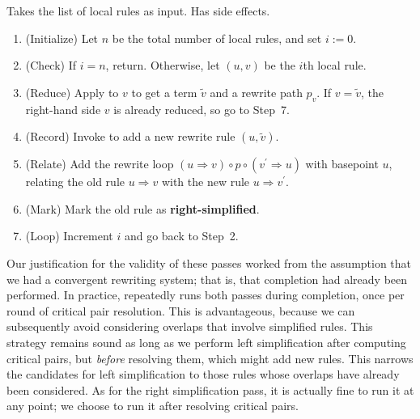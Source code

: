 \documentclass[../generics]{subfiles}
\begin{document}
\begin{algorithm}\label{right simplification}
Takes the list of local rules as input. Has side effects.
\begin{enumerate}
\item (Initialize) Let $n$ be the total number of local rules, and set $i:=0$.
\item (Check) If $i=n$, return. Otherwise, let $(u, v)$ be the $i$th local rule.
\item (Reduce) Apply  to $v$ to get a term $\tilde{v}$ and a rewrite path $p_v$. If $v=\tilde{v}$, the right-hand side $v$ is already reduced, so go to Step~7.
\item (Record) Invoke  to add a new rewrite rule $(u, \tilde{v})$.
\item (Relate) Add the rewrite loop $(u\Rightarrow v)\circ p\circ(v^\prime\Rightarrow u)$ with basepoint $u$, relating the old rule $u\Rightarrow v$ with the new rule $u\Rightarrow v^\prime$.
\item (Mark) Mark the old rule as \textbf{right-simplified}.
\item (Loop) Increment $i$ and go back to Step~2.
\end{enumerate}
\end{algorithm}

Our justification for the validity of these passes worked from the assumption that we had a convergent rewriting system; that is, that completion had already been performed. In practice,  repeatedly runs both passes during completion, once per round of critical pair resolution. This is advantageous, because we can subsequently avoid considering overlaps that involve simplified rules. This strategy remains sound as long as we perform left simplification after computing critical pairs, but \emph{before} resolving them, which might add new rules. This narrows the candidates for left simplification to those rules whose overlaps have already been considered. As for the right simplification pass, it is actually fine to run it at any point; we choose to run it after resolving critical pairs.
\end{document}
